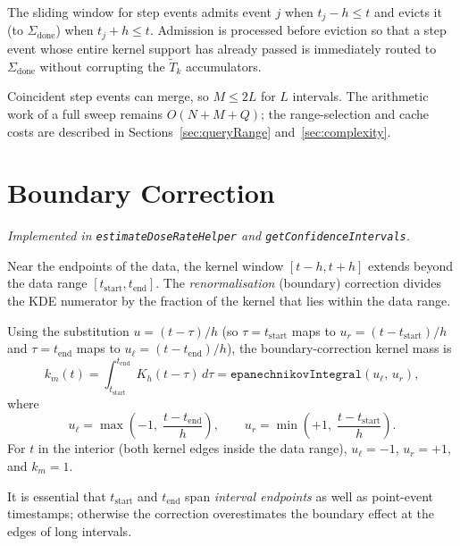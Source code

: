 \documentclass[11pt,a4paper]{article}
\newcommand{\h}{h}                   %
\newcommand{\km}{k_m}                %
\begin{document}
The sliding window for step events admits event $j$ when
$t_j - \h \le t$ and evicts it (to $\Sigma_{\mathrm{done}}$) when
$t_j + \h \le t$.  Admission is processed before eviction so that a step
event whose entire kernel support has already passed is immediately routed to
$\Sigma_{\mathrm{done}}$ without corrupting the $\tilde T_k$ accumulators.

Coincident step events can merge, so $M\le 2L$ for $L$ intervals.  The
arithmetic work of a full sweep remains $O(N+M+Q)$; the range-selection
and cache costs are described in Sections~\ref{sec:queryRange}
and~\ref{sec:complexity}.

\section{Boundary Correction}
\label{sec:boundary}

\noindent\textit{Implemented in \texttt{estimateDoseRateHelper} and
\texttt{getConfidenceIntervals}.}

\medskip\noindent
Near the endpoints of the data, the kernel window $[t-\h, t+\h]$ extends
beyond the data range $[t_{\mathrm{start}}, t_{\mathrm{end}}]$.  The
\emph{renormalisation} (boundary) correction divides the KDE numerator by
the fraction of the kernel that lies within the data range.

Using the substitution $u = (t - \tau)/\h$ (so $\tau = t_{\mathrm{start}}$
maps to $u_r = (t - t_{\mathrm{start}})/\h$ and $\tau = t_{\mathrm{end}}$
maps to $u_\ell = (t - t_{\mathrm{end}})/\h$), the boundary-correction kernel
mass is
\begin{equation}
  \km(t) = \int_{t_{\mathrm{start}}}^{t_{\mathrm{end}}} K_\h(t-\tau)\,d\tau
          = \texttt{epanechnikovIntegral}(u_\ell,\, u_r),
  \label{eq:km}
\end{equation}
where
\begin{equation}
  u_\ell = \max\!\left(-1,\;\frac{t - t_{\mathrm{end}}}{\h}\right),\qquad
  u_r    = \min\!\left(+1,\;\frac{t - t_{\mathrm{start}}}{\h}\right).
  \label{eq:ulu}
\end{equation}
For $t$ in the interior (both kernel edges inside the data range),
$u_\ell = -1$, $u_r = +1$, and $\km = 1$.

It is essential that $t_{\mathrm{start}}$ and $t_{\mathrm{end}}$ span
\emph{interval endpoints} as well as point-event timestamps; otherwise the
correction overestimates the boundary effect at the edges of long intervals.
\end{document}

